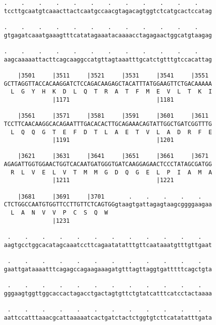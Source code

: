 \documentclass{article}
\begin{document}
\begin{Verbatim}
.    .    .    .    .    .    .    .    .    .    .    .    
tccttgcaatgtcaaacttactcaatgccaacgtagacagtggtctcatgcactccatag
                                                            
.    .    .    .    .    .    .    .    .    .    .    .    
gtgagatcaaatgaaagtttcatatagaaatacaaaacctagagaactggcatgtaagag
                                                            
.    .    .    .    .    .    .    .    .    .    .    .    
aagcaaaaattacttcagcaaggccatgttagtaaatttgcatctgtttgtccacattag
                                                            
    |3501     |3511     |3521     |3531     |3541     |3551 
GCTTAGGTTACCACAAGGATCTCCAGACAAGAGCTACATTTATGGAAGTTCTGACAAAAA
  L  G  Y  H  K  D  L  Q  T  R  A  T  F  M  E  V  L  T  K  I
              |1171                         |1181           
  
    |3561     |3571     |3581     |3591     |3601     |3611 
TCCTTCAACAAGGCACAGAATTTGACACACTTGCAGAAACAGTATTGGCTGATCGGTTTG
  L  Q  Q  G  T  E  F  D  T  L  A  E  T  V  L  A  D  R  F  E
              |1191                         |1201           
  
    |3621     |3631     |3641     |3651     |3661     |3671 
AGAGATTGGTGGAACTGGTCACAATGATGGGTGATCAAGGAGAACTCCCTATAGCGATGG
  R  L  V  E  L  V  T  M  M  G  D  Q  G  E  L  P  I  A  M  A
              |1211                         |1221           
  
    |3681     |3691     |3701       .    .    .    .    .   
CTCTGGCCAATGTGGTTCCTTGTTCTCAGTGGgtaagtgattagagtaagcggggaagaa
  L  A  N  V  V  P  C  S  Q  W                              
              |1231                                         
  
 .    .    .    .    .    .    .    .    .    .    .    .   
aagtgcctggcacatagcaaatccttcagaatatatttgttcaataaatgtttgttgaat
                                                            
 .    .    .    .    .    .    .    .    .    .    .    .   
gaattgataaaatttcagagccagaagaaagatgtttagttaggtgatttttcagctgta
                                                            
 .    .    .    .    .    .    .    .    .    .    .    .   
gggaagtggttggcaccactagacctgactagtgttctgtatcatttcatcctactaaaa
                                                            
 .    .    .    .    .    .    .    .    .    .    .    .   
aattccatttaaacgcattaaaaatcactgatctactctggtgtcttcatatatttgata
                                                            

\end{Verbatim}
\end{document}
